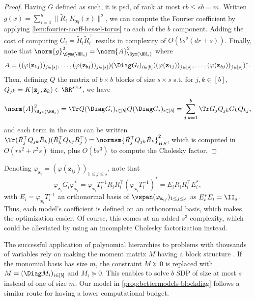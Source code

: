 \documentclass{article}
\begin{document}
\begin{proof}
  Having $G$ defined as such, it is psd, of rank at most $rb \leq sb = m$. Written $g(x) = \sum_{i = 1}^b \lVert\tilde{R}_i^\top K_{\mathbf{z_i}}(x)\rVert^2$, we can compute the Fourier coefficient by applying \cref{lem:fourier-coeff-bessel-torus} to each of the $b$ component. Adding the cost of computing $G_{i} = \tilde{R}_{i} \tilde{R}_{i}^\top$ results in complexity of $O(b s^2 (d r + s))$. Finally, note that $\norm{g}_{\Sym(\HH_s)}^2 = \norm{A}_{\Sym(\HH_s)}^2$ where
  \begin{equation*}
    A = ((\varphi(\mathbf{z}_{1j}))_{j \in [s]}, \dots, (\varphi(\mathbf{z}_{bj}))_{j \in [s]}) (\Diag G_i)_{i \in [b]} ((\varphi(\mathbf{z}_{1j}))_{j \in [s]}, \dots, (\varphi(\mathbf{z}_{bj}))_{j \in [s]})^*.
  \end{equation*}
  Then, defining $Q$ the matrix of $b \times b$ blocks of size $s \times s$ s.t. for $j, k \in [b]$, $Q_{jk} = K(\mathbf{z}_j, \mathbf{z}_k) \in \RR^{s\times s}$, we have
  \begin{equation}\label{eq:hs-norm-blockdiag-model}
    \norm{A}_{\Sym(\HH_s)}^2 = \Tr Q (\Diag G_i)_{i \in [b]} Q (\Diag G_i)_{i \in [b]} = \sum_{j, k = 1}^b \Tr G_j Q_{jk} G_k Q_{kj},
  \end{equation}
  and each term in the sum can be written $\Tr (\tilde{R}_j^\top Q_{jk} \tilde{R}_k) (\tilde{R}_k^\top Q_{kj} \tilde{R}_j^\top) = \normsm{\tilde{R}_j^\top Q_{jk} \tilde{R}_k}_{HS}^2$, which is computed in $O(r s^2 + r^2 s)$ time, plus $O(b s^3)$ to compute the Cholesky factor.
\end{proof}
Denoting $\varphi_{\mathbf{z}_i} = (\varphi(\mathbf{z}_{ij}))_{1 \leq j \leq s}$, note that
\begin{equation}
  \varphi_{\mathbf{z}_i} G_i \varphi_{\mathbf{z}_i}^* = \varphi_{\mathbf{z}_i} T_i^{-1} R_i R_i^\top (\varphi_{\mathbf{z}_i} T_i^{-1})^* = E_i R_i R_i^\top E_i^*,
\end{equation}
with $E_i = \varphi_{\mathbf{z}_i} T_i^{-1}$ an orthonormal basis of $\vspan (\varphi_{\mathbf{z}_{ij}})_{1 \leq j \leq s}$ as $E_i^* E_i = \II_s$. Thus, each model's coefficient is defined on an orthonormal basis, which makes the optimization easier. Of course, this comes at an added $s^3$ complexity, which could be alleviated by using \eg an incomplete Cholesky factorization instead.

\begin{remark}
  The successful application of polynomial hierarchies to problems with thousands of variables rely on making the moment matrix $M$ having a block structure \cite{wangTSSOSMomentSOSHierarchy2021,wangChordalTSSOSMomentSOSHierarchy2021}. If the monomial basis has size $m$, the constraint $M \succeq 0$ is replaced with $M = (\Diag M_i)_{i \in [b]}$ and $M_i \succeq 0$. This enables to solve $b$ SDP of size at most $s$ instead of one of size $m$. Our model in \cref{prop:bettermodels-blockdiag} follows a similar route for having a lower computational budget.
\end{remark}
\end{document}
